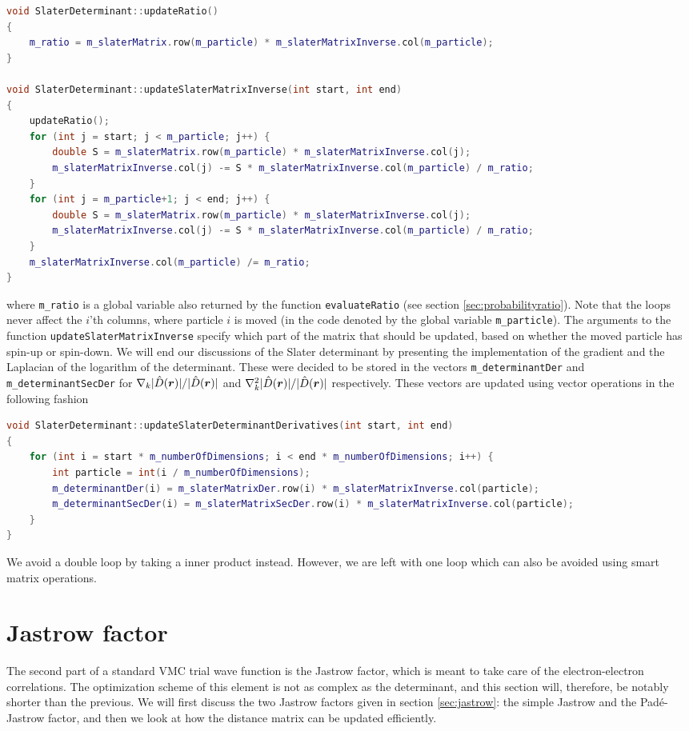\begin{lstlisting}[language={c++}]
void SlaterDeterminant::updateRatio()
{
	m_ratio = m_slaterMatrix.row(m_particle) * m_slaterMatrixInverse.col(m_particle);
}

void SlaterDeterminant::updateSlaterMatrixInverse(int start, int end)
{
	updateRatio();
	for (int j = start; j < m_particle; j++) {
		double S = m_slaterMatrix.row(m_particle) * m_slaterMatrixInverse.col(j);
		m_slaterMatrixInverse.col(j) -= S * m_slaterMatrixInverse.col(m_particle) / m_ratio;
	}
	for (int j = m_particle+1; j < end; j++) {
		double S = m_slaterMatrix.row(m_particle) * m_slaterMatrixInverse.col(j);
		m_slaterMatrixInverse.col(j) -= S * m_slaterMatrixInverse.col(m_particle) / m_ratio;
	}
	m_slaterMatrixInverse.col(m_particle) /= m_ratio;
}
\end{lstlisting}
where \lstinline{m_ratio} is a global variable also returned by the function \lstinline{evaluateRatio} (see section \ref{sec:probabilityratio}). Note that the loops never affect the $i$'th columns, where particle $i$ is moved (in the code denoted by the global variable \lstinline{m_particle}). The arguments to the function \lstinline{updateSlaterMatrixInverse} specify which part of the matrix that should be updated, based on whether the moved particle has spin-up or spin-down. We will end our discussions of the Slater determinant by presenting the implementation of the gradient and the Laplacian of the logarithm of the determinant. These were decided to be stored in the vectors \lstinline{m_determinantDer} and \lstinline{m_determinantSecDer} for $\nabla_k|\hat{D}(\boldsymbol{{r}})|/|\hat{D}(\boldsymbol{{r}})|$ and $\nabla_k^2|\hat{D}(\boldsymbol{{r}})|/|\hat{D}(\boldsymbol{{r}})|$ respectively. These vectors are updated using vector operations in the following fashion
\begin{lstlisting}[language={c++}]
void SlaterDeterminant::updateSlaterDeterminantDerivatives(int start, int end)
{
	for (int i = start * m_numberOfDimensions; i < end * m_numberOfDimensions; i++) {
		int particle = int(i / m_numberOfDimensions);
		m_determinantDer(i) = m_slaterMatrixDer.row(i) * m_slaterMatrixInverse.col(particle);
		m_determinantSecDer(i) = m_slaterMatrixSecDer.row(i) * m_slaterMatrixInverse.col(particle);
	}
}
\end{lstlisting}
We avoid a double loop by taking a inner product instead. However, we are left with one loop which can also be avoided using smart matrix operations.

\section{Jastrow factor}
The second part of a standard VMC trial wave function is the Jastrow factor, which is meant to take care of the electron-electron correlations. The optimization scheme of this element is not as complex as the determinant, and this section will, therefore, be notably shorter than the previous. We will first discuss the two Jastrow factors given in section \ref{sec:jastrow}: the simple Jastrow and the Padé-Jastrow factor, and then we look at how the distance matrix can be updated efficiently. 

